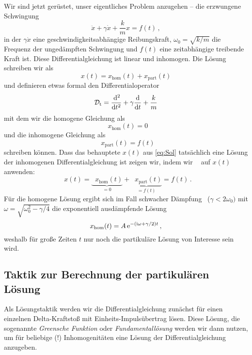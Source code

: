 \documentclass[paper=a4, fontsize=11.0pt, abstractoff, DIV12]{scrartcl}
\newcommand{\xhom}{\ensuremath{x_\mathrm{hom}}}
\newcommand{\xinhom}{\ensuremath{x_\mathrm{part}}}
\DeclareMathOperator{\Dt}{\mathcal{D}_t}
\begin{document}
Wir sind jetzt gerüstet, unser eigentliches Problem anzugehen -- die erzwungene
Schwingung
\begin{equation}
\ddot{x} + \gamma\dot{x} + \frac{k}{m}x = f(t)\,,
\end{equation}
in der $\gamma \dot{x}$ eine geschwindigkeitsabhängige Reibungskraft,
$\omega_0 = \sqrt{k/m}$ die Frequenz der ungedämpften Schwingung und $f(t)$
eine zeitabhängige treibende Kraft ist. Diese Differentialgleichung ist linear
und inhomogen. Die Lösung schreiben wir als
\begin{equation}
x(t) = \xhom(t) + \xinhom(t)
\label{eq:Sol}
\end{equation}
und definieren etwas formal den Differentialoperator
\begin{equation}
\Dt = \secondderiv{}{t} + \gamma\firstderiv{}{t} + \frac{k}{m}
\end{equation}
mit dem wir die homogene Gleichung als
\begin{equation}
\Dt \xhom(t) = 0
\end{equation}
und die inhomogene Gleichung als
\begin{equation}
\Dt \xinhom(t) = f(t)
\label{eq:inhomLsg}
\end{equation}
schreiben können. Dass das behauptete $x(t)$ aus \eqref{eq:Sol} tatsächlich
eine Lösung der inhomogenen Differentialgleichung ist zeigen wir, indem wir
$\Dt$ auf $x(t)$ anwenden:
\begin{equation}
\Dt x(t) = \underbrace{\Dt \xhom(t)}_{=0} + \underbrace{\Dt \xinhom(t)}_{=f(t)} = f(t)\,.
\end{equation}
Für die homogene Lösung ergibt sich im Fall \glqq schwacher Dämpfung\grqq~
($\gamma < 2\omega_0)$ mit $\omega = \sqrt{\omega_0^2 - \gamma/4}$ die
exponentiell ausdämpfende Lösung
\begin{equation}
\xhom(t) = A \eto{-(\ii \omega + \gamma/2)t}\,,
\end{equation}
weshalb für große Zeiten $t$ nur noch die partikuläre Lösung von Interesse
sein wird.

\subsection{Taktik zur Berechnung der partikulären Lösung}

Als Lösungstaktik werden wir die Differentialgleichung zunächst für einen
einzelnen Delta-Kraftstoß mit Einheits-Impulsübertrag lösen. Diese Lösung,
die sogenannte \emph{Greensche Funktion} oder \emph{Fundamentallösung}
werden wir dann nutzen, um für beliebige (!) Inhomogenitäten eine Lösung der
Differentialgleichung anzugeben.
\end{document}
